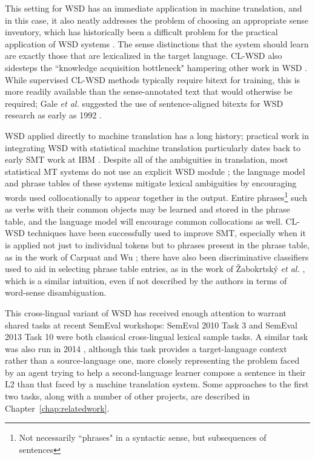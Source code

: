This setting for WSD has an immediate application in machine translation, and
in this case, it
also neatly addresses the problem of choosing an appropriate sense inventory,
which has historically been a difficult problem for the practical application
of WSD systems \cite{agirre2006word}. The sense distinctions that the system
should learn are exactly those that are lexicalized in the target language.
CL-WSD also sidesteps the ``knowledge acquisition bottleneck" hampering other
work in WSD \cite{lefever-hoste-decock:2011:ACL-HLT2011}.
While supervised CL-WSD methods typically require bitext for training, this is
more readily available than the sense-annotated text that would otherwise be
required; Gale \emph{et al.} suggested the use of sentence-aligned bitexts for
WSD research as early as 1992 \cite{gale1992method}.

WSD applied directly to machine translation has a long history; practical work
in integrating WSD with statistical machine translation particularly dates back
to early SMT work at IBM \cite{Brown91word-sensedisambiguation}.
Despite all of the ambiguities in translation,
most statistical MT systems do not use an explicit WSD module
\cite[Chapter~3]{agirre2006word};
the language model and phrase tables of these systems mitigate lexical
ambiguities by encouraging words used collocationally to appear together in the
output. Entire phrases\footnote{Not necessarily ``phrases" in a syntactic
sense, but subsequences of sentences} such as verbs with their common objects
may be learned and stored in the phrase table, and the language model will
encourage common collocations as well. CL-WSD techniques have been successfully
used to improve SMT, especially when it is applied not just to individual
tokens but to phrases present in the phrase table, as in the work of Carpuat
and Wu \cite{carpuatpsd}; there have also been discriminative classifiers used
to aid in selecting phrase table entries, as in the work of 
Žabokrtsk\'{y} \emph{et al.} \cite{vzabokrtsky-popel-marevcek:2010:WMT}, which
is a similar intuition, even if not described by the authors in terms of
word-sense disambiguation.

This cross-lingual variant of WSD has received enough attention to warrant
shared tasks at recent SemEval workshops: SemEval 2010 Task 3
\cite{lefever-hoste:2010:SemEval} and SemEval 2013 Task 10 \cite{task10} were
both classical cross-lingual lexical sample tasks. 
A similar task was also run in 2014 \cite{vangompel-EtAl:2014:SemEval},
although this task provides a target-language context rather than a
source-language one, more closely representing the problem faced by an agent
trying to help a second-language learner compose a sentence in their L2 than
that faced by a machine translation system.
Some approaches to the first two tasks, along with a number of other projects,
are described in Chapter~\ref{chap:relatedwork}.

